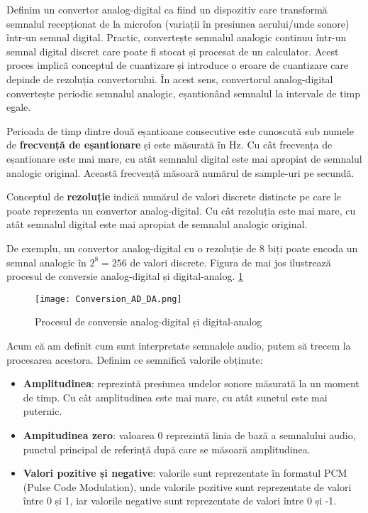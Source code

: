 \par
Definim un convertor analog-digital ca fiind un dispozitiv care transformă semnalul recepționat 
de la microfon (variații în presiunea aerului/unde sonore) într-un semnal digital.
Practic, convertește semnalul analogic continuu într-un
semnal digital discret care poate fi stocat și procesat de un calculator. Acest proces implică
conceptul de cuantizare și introduce o eroare de cuantizare care depinde de rezoluția convertorului.
În acest sens, convertorul analog-digital convertește periodic semnalul analogic, eșantionând semnalul
la intervale de timp egale.
\par
Perioada de timp dintre două eșantioane consecutive este cunoscută sub numele de \textbf{frecvență de eșantionare}
și este măsurată în Hz. Cu cât frecvența de eșantionare este mai mare, cu atât semnalul digital este mai apropiat
de semnalul analogic original. Această frecvență măsoară numărul de sample-uri pe secundă.
\par
Conceptul de \textbf{rezoluție} indică numărul de valori discrete distincte pe care le poate 
reprezenta un convertor analog-digital. Cu cât rezoluția este mai mare, cu atât semnalul digital
este mai apropiat de semnalul analogic original.
\par
De exemplu, un convertor analog-digital cu o rezoluție de 8 biți poate encoda un semnal analogic
în $2^8 = 256$ de valori discrete. Figura de mai jos ilustrează procesul de conversie analog-digital
și digital-analog. \ref{fig:conversion-ad-da}

\begin{figure}[h]
    \centering
    \texttt{[image: Conversion\_AD\_DA.png]}
    \caption{Procesul de conversie analog-digital și digital-analog\protect\footnotemark[1]}
    \label{fig:conversion-ad-da}
\end{figure}

\par
Acum că am definit cum sunt interpretate semnalele audio, putem să trecem la procesarea acestora.
Definim ce semnifică valorile obținute:

\begin{itemize}
    \item \textbf{Amplitudinea}: reprezintă presiunea undelor sonore măsurată la un moment de timp.
    Cu cât amplitudinea este mai mare, cu atât sunetul este mai puternic.
    \item \textbf{Ampitudinea zero}: valoarea 0 reprezintă linia de bază a semnalului audio, punctul
    principal de referință după care se măsoară amplitudinea.
    \item \textbf{Valori pozitive și negative}: valorile sunt reprezentate în formatul PCM (Pulse Code Modulation),
    unde valorile pozitive sunt reprezentate de valori între 0 și 1, iar valorile negative sunt reprezentate
    de valori între 0 și -1.
\end{itemize}

